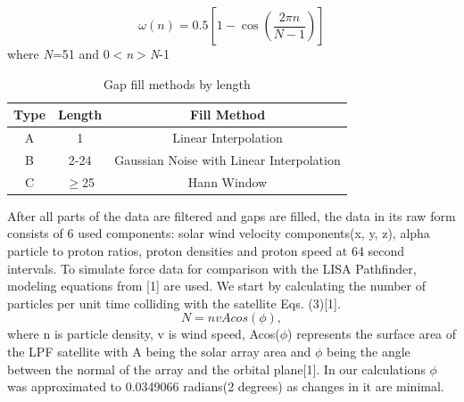 \documentclass[%
 reprint,
 amsmath,amssymb,
 aps,
]{revtex4-2}
\begin{document}
\begin{equation}\label{eq:Hanning Window}
\omega(n)=0.5[1-\cos{(\frac{2\pi n}{N-1})}]
\end{equation}
where \textit{N}=51 and 0$<$\textit{n}$>$\textit{N}-1

\begin{table}[htbp]
\caption{Gap fill methods by length}
\begin{center}
\renewcommand{\arraystretch}{1.5}
\begin{tabular}{|c|c|c|}
\hline
Type & Length & Fill Method\\
\hline
A & 1 & Linear Interpolation\\
\hline
B & 2-24 & Gaussian Noise with Linear Interpolation\\
\hline
C & $\geq$25 & Hann Window\\
\hline

\end{tabular}
\label{tab1}
\end{center}
\end{table}



After all parts of the data are filtered and gaps are filled, the data in its raw form consists of 6 used components: solar wind velocity components(x, y, z), alpha particle to proton ratios, proton densities and proton speed at 64 second intervals. To simulate force data for comparison with the LISA Pathfinder, modeling equations from [1] are used. We start by calculating the number of particles per unit time colliding with the satellite Eqs. (3)[1].
\begin{equation}\label{eq:Hanning Window}
N=n v Acos(\phi),
\end{equation}
where n is particle density, v is wind speed, Acos(\(\phi\)) represents the surface area of the LPF satellite with A being the solar array area and \(\phi\) being the angle between the normal of the array and the orbital plane[1]. In our calculations \(\phi\) was approximated to 0.0349066 radians(2 degrees) as changes in it are minimal.
\end{document}
